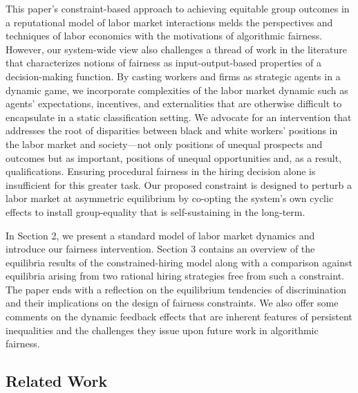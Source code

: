 \documentclass[sigconf]{acmart}
\theoremstyle{definition}
\begin{document}
This paper's constraint-based approach to achieving equitable group outcomes in a reputational model of labor market interactions melds the perspectives and techniques of labor economics with the motivations of algorithmic fairness. However, our system-wide view also challenges a thread of work in the literature that characterizes notions of fairness as input-output-based properties of a decision-making function. By casting workers and firms as strategic agents in a dynamic game, we incorporate complexities of the labor market dynamic such as agents' expectations, incentives, and externalities that are otherwise difficult to encapsulate in a static classification setting. We advocate for an intervention that addresses the root of disparities between black and white workers' positions in the labor market and society---not only positions of unequal prospects and outcomes but as important, positions of unequal opportunities and, as a result, qualifications. Ensuring procedural fairness in the hiring decision alone is insufficient for this greater task. Our proposed constraint is designed to perturb a labor market at asymmetric equilibrium by co-opting the system's own cyclic effects to install group-equality that is self-sustaining in the long-term. 


In Section 2, we present a standard model of labor market dynamics and introduce our fairness intervention. Section 3 contains an overview of the equilibria results of the constrained-hiring model along with a comparison against equilibria arising from two rational hiring strategies free from such a constraint. The paper ends with a reflection on the equilibrium tendencies of discrimination and their implications on the design of fairness constraints. We also offer some comments on the dynamic feedback effects that are inherent features of persistent inequalities and the challenges they issue upon future work in algorithmic fairness.

\subsection{Related Work}
\end{document}
